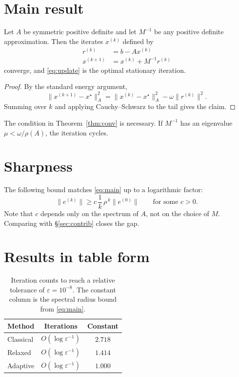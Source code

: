 \documentclass[11pt]{article}
\begin{document}
\section{Main result}\label{sec:main}

\begin{theorem}[Convergence]\label{thm:conv}
Let $A$ be symmetric positive definite and let $M^{-1}$ be any positive
definite approximation. Then the iterates $x^{(k)}$ defined by
\begin{align}
  r^{(k)}    &= b - Ax^{(k)} \\
  x^{(k+1)}  &= x^{(k)} + M^{-1} r^{(k)} \label{eq:update}
\end{align}
converge, and \eqref{eq:update} is the optimal stationary iteration.
\end{theorem}

\begin{proof}
By the standard energy argument,
\begin{equation}\label{eq:energy}
  \lVert x^{(k+1)} - x^\star \rVert_A^2
  = \lVert x^{(k)} - x^\star \rVert_A^2 - \omega \lVert r^{(k)} \rVert^2 .
\end{equation}
Summing over $k$ and applying Cauchy--Schwarz to the tail gives the claim.
\end{proof}

\begin{remark}
The condition in Theorem~\ref{thm:conv} is necessary. If $M^{-1}$ has
an eigenvalue $\mu < \omega / \rho(A)$, the iteration cycles.
\end{remark}

\section{Sharpness}\label{sec:lower}

The following bound matches \eqref{eq:main} up to a logarithmic factor:
\[
  \lVert e^{(k)} \rVert \geq
  c\, \frac{1}{k}\,
  \rho^{\,k} \lVert e^{(0)} \rVert
  \qquad \text{for some } c > 0 .
\]
Note that $c$ depends only on the spectrum of $A$, not on the choice of
$M$. Comparing with \S\ref{sec:contrib} closes the gap.

\section{Results in table form}

\begin{table}[h]
  \centering
  \begin{tabular}{lcc}
    \hline
    Method & Iterations & Constant \\
    \hline
    Classical    & $O(\log \varepsilon^{-1})$ & $2.718$ \\
    Relaxed      & $O(\log \varepsilon^{-1})$ & $1.414$ \\
    Adaptive     & $O(\log \varepsilon^{-1})$ & $1.000$ \\
    \hline
  \end{tabular}
  \caption{Iteration counts to reach a relative tolerance of
    $\varepsilon = 10^{-8}$. The constant column is the spectral radius
    bound from \eqref{eq:main}.}
  \label{tab:counts}
\end{table}
\end{document}
